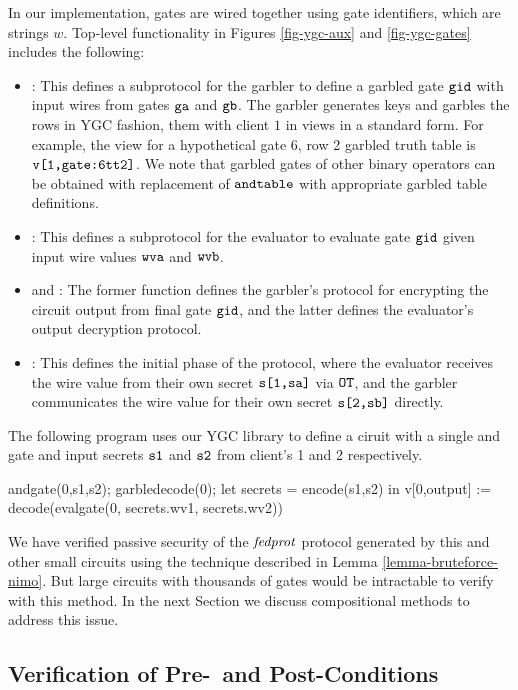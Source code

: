 In our implementation, gates are wired together using gate
identifiers, which are strings $w$. Top-level functionality in Figures
\ref{fig-ygc-aux} and \ref{fig-ygc-gates} includes the following:
\begin{itemize}
\item {}: This defines a subprotocol for the garbler
  to define a garbled gate $\texttt{gid}$ with input wires from gates
  $\texttt{ga}$ and $\texttt{gb}$. The garbler generates keys and garbles
  the rows in YGC fashion, them with client $1$ in
  views in a standard form. For example, the view for
  a hypothetical gate 6, row 2 garbled truth table is $\texttt{v[1,gate:6tt2]}$.
  We note that garbled gates of other binary operators can be obtained with
  replacement of $\texttt{andtable}$ with appropriate garbled  table definitions. 
\item {}: This defines a subprotocol for the evaluator to
  evaluate gate $\texttt{gid}$ given input wire values $\texttt{wva}$ and
  $\texttt{wvb}$.
\item {} and : The former function
  defines the garbler's protocol for encrypting the circuit
  output from final gate $\texttt{gid}$, and the latter defines
  the evaluator's output decryption protocol.
\item {}: This defines the initial phase of the protocol,
  where the evaluator receives the wire value from their own
  secret $\texttt{s[1,sa]}$ via $\texttt{OT}$, and the garbler communicates
  the wire value for their own secret $\texttt{s[2,sb]}$ directly.
\end{itemize}
\begin{example}
  \label{example-andcircuit}
The following program uses our YGC library to define
a ciruit with a single and gate and input secrets $\texttt{s1}$ and
$\texttt{s2}$ from client's 1 and 2 respectively. 
\begin{verbatimtab}
  andgate(0,s1,s2);
  garbledecode(0);
  let secrets = encode(s1,s2) in
  v[0,output] := decode(evalgate(0, secrets.wv1, secrets.wv2))
\end{verbatimtab}
\end{example}
We have verified passive security of the $\mathit{fedprot}$ protocol
generated by this and other small circuits using the
technique described in Lemma \ref{lemma-bruteforce-nimo}.
But large circuits with thousands of gates would be
intractable to verify with this method. In the next Section
we discuss compositional methods to address this issue.

\subsection{Verification of Pre-~and Post-Conditions}

